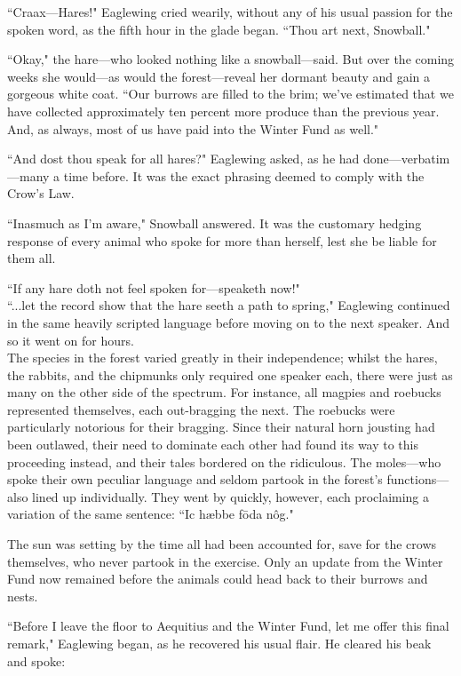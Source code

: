 ``Craax---Hares!" Eaglewing cried wearily, without any of his usual passion for the spoken word, as the fifth hour in the glade began.
``Thou art next, Snowball."

``Okay," the hare---who looked nothing like a snowball---said.
But over the coming weeks she would---as would the forest---reveal her dormant beauty and gain a gorgeous white coat.
``Our burrows are filled to the brim; we've estimated that we have collected approximately ten percent more produce than the previous year.
And, as always, most of us have paid into the Winter Fund as well."

``And dost thou speak for all hares?" Eaglewing asked, as he had done---verbatim---many a time before.
It was the exact phrasing deemed to comply with the Crow's Law.

``Inasmuch as I'm aware," Snowball answered.
It was the customary hedging response of every animal who spoke for more than herself, lest she be liable for them all.

``If any hare doth not feel spoken for---speaketh now!"\\

``...let the record show that the hare seeth a path to spring," Eaglewing continued in the same heavily scripted language before moving on to the next speaker.
And so it went on for hours.\\

The species in the forest varied greatly in their independence; whilst the hares, the rabbits, and the chipmunks only required one speaker each, there were just as many on the other side of the spectrum.
For instance, all magpies and roebucks represented themselves, each out-bragging the next.
The roebucks were particularly notorious for their bragging.
Since their natural horn jousting had been outlawed, their need to dominate each other had found its way to this proceeding instead, and their tales bordered on the ridiculous.
The moles---who spoke their own peculiar language and seldom partook in the forest's functions---also lined up individually.
They went by quickly, however, each proclaiming a variation of the same sentence: ``Ic hæbbe fōda nôg."

The sun was setting by the time all had been accounted for, save for the crows themselves, who never partook in the exercise.
Only an update from the Winter Fund now remained before the animals could head back to their burrows and nests.

``Before I leave the floor to Aequitius and the Winter Fund, let me offer this final remark," Eaglewing began, as he recovered his usual flair.
He cleared his beak and spoke:

